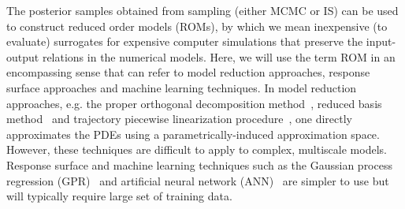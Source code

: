 \documentclass[11pt]{article}
\begin{document}
The posterior samples obtained from sampling (either MCMC or IS) can be used to construct reduced order models (ROMs), by which we mean inexpensive (to evaluate) surrogates for expensive computer simulations that preserve the input-output relations in the numerical models.
Here, we will use the term ROM in an encompassing sense that can refer to model reduction approaches, response surface approaches and machine learning techniques. In model reduction approaches, e.g. the proper orthogonal decomposition method~\cite{Cardoso:2009jn, Lieberman:2010dw, Willcox:2002uk}, reduced basis method~\cite{Prudhomme:2002ug,Quarteroni:2011jm} and trajectory piecewise linearization procedure~\cite{Cardoso:2010, Rewienski:2003tr}, one directly approximates the PDEs using a parametrically-induced approximation space. However, these techniques are difficult to apply to complex, multiscale models. Response surface and machine learning techniques such as the Gaussian process regression (GPR)~\cite{Rasmussen:2006vz} and artificial neural network (ANN)~\cite{Cybenko:1992vo} are simpler to use but will typically require large set of training data.   
%
%
%
\end{document}
